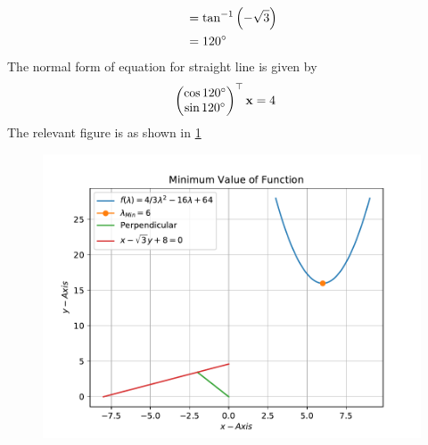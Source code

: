 \documentclass[12pt]{article}
\providecommand{\brak}[1]{\ensuremath{\left(#1\right)}}
\newcommand{\myvec}[1]{\ensuremath{\begin{pmatrix}#1\end{pmatrix}}}
\let\vec\mathbf
\begin{document}
\begin{enumerate}
\begin{align}
	 &= \tan^{-1}\brak{-\sqrt{3}} \\
	 &= 120\degree
\end{align}
The normal form of equation for straight line is given by
\begin{align}
	\myvec{\cos120\degree \\ \sin120\degree}^\top\vec{x} &= 4 
\end{align}
The relevant figure is as shown in \ref{fig:Fig1}
\begin{figure}[!h]
	\begin{center}
		\includegraphics[width=\columnwidth]{figs/problem3.1.pdf}
	\end{center}
\caption{}
\label{fig:Fig1}
\end{figure}
\end{enumerate}
\end{document}

